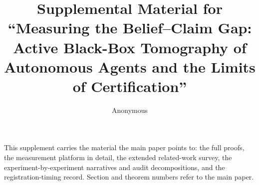 \documentclass[journal]{IEEEtran}
\theoremstyle{plain}
\theoremstyle{definition}
\theoremstyle{remark}
\begin{document}
\title{Supplemental Material for\\[2pt]
``Measuring the Belief--Claim Gap: Active Black-Box Tomography of Autonomous
Agents and the Limits of Certification''}
\author{Anonymous}
\maketitle

\noindent This supplement carries the material the main paper points to:
the full proofs, the measurement platform in detail, the extended related-work
survey, the experiment-by-experiment narratives and audit decompositions, and
the registration-timing record. Section and theorem numbers refer to the main
paper.

















\end{document}
